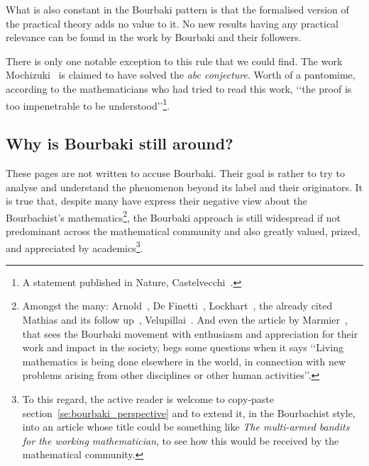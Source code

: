 \documentclass[]{scrartcl}
\theoremstyle{definition}
\begin{document}
What is also constant in the Bourbaki pattern is that the formalised version of the practical theory adds no value to it. No new results having any practical relevance can be found in the work by Bourbaki and their followers.

There is only one notable exception to this rule that we could find. The work Mochizuki~\cite{mochizuki2012inter} is claimed to have solved the \emph{abc conjecture}. Worth of a pantomime, according to the mathematicians who had tried to read this work, \lq\lq the proof is too impenetrable to be understood\rq\rq\footnote{A statement published in Nature, Castelvecchi~\cite{castelvecchi2015biggest}.}.

\subsection*{Why is Bourbaki still around?}




These pages are not written to accuse Bourbaki. Their goal is rather to try to analyse and understand the phenomenon beyond its label and their originators.
It is true that, despite many have express their negative view about the Bourbachist's mathematics\footnote{
    Amongst the many: Arnold~\cite{arnol1998teaching}, De Finetti~\cite{de2008bruno}, Lockhart~\cite{lockhart2009mathematician}, the already cited Mathias and its follow up~\cite{mathias1998further}, Velupillai~\cite{velupillai2012bourbaki}. And even the article by Marmier~\cite{marmier2014idea}, that sees the Bourbaki movement with enthusiasm and appreciation for their work and impact in the society, begs some questions when it says
    \lq\lq Living mathematics is being done elsewhere in the world, in connection with new problems arising from other disciplines or other human activities\rq\rq.
}, the Bourbaki approach is still widespread if not predominant across the mathematical community and also greatly valued, prized, and appreciated by academics\footnote{
    To this regard, the active reader is welcome to copy-paste section~\ref{se:bourbaki_perspective} and to extend it, in the Bourbachist style, into an article whose title could be something like \emph{The multi-armed bandits for the working mathematician}, to see how this would be received by the mathematical community.
}.
\end{document}
